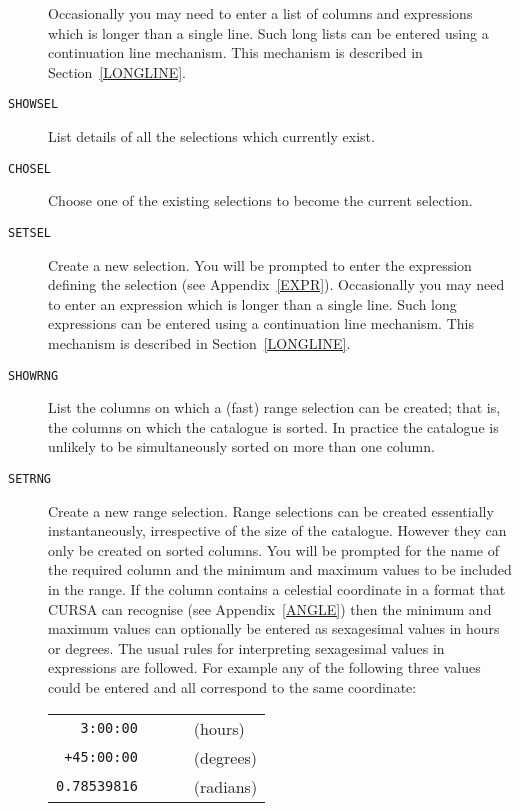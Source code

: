 \documentclass[twoside,11pt]{starlink}
\begin{document}
\begin{description}
   Occasionally you may need to enter a list of columns and expressions
   which is longer than a single line.  Such long lists can be entered
   using a continuation line mechanism.  This mechanism is described in
   Section~\ref{LONGLINE}.

  \item[ \texttt{SHOWSEL} ] List details of all the selections which
   currently exist.

  \item[ \texttt{CHOSEL} ] Choose one of the existing selections to become
   the current selection.

  \item[ \texttt{SETSEL} ] Create a new selection.  You will be prompted to
   enter the expression defining the selection (see Appendix~\ref{EXPR}).
   Occasionally you may need to enter an expression which is longer than a
   single line.  Such long expressions can be entered using a continuation
   line mechanism.  This mechanism is described in Section~\ref{LONGLINE}.

  \item[ \texttt{SHOWRNG} ] List the columns on which a (fast) range
   selection can be created; that is, the columns on which the
   catalogue is sorted. In practice the catalogue is unlikely to be
   simultaneously sorted on more than one column.

  \item[ \texttt{SETRNG} ] Create a new range selection.  Range selections
   can be created essentially instantaneously, irrespective of the
   size of the catalogue.  However they can only be created on sorted
   columns.  You will be prompted for the name of the required column
   and the minimum and maximum values to be included in the range. If
   the column contains a celestial coordinate in a format that CURSA
   can recognise (see Appendix~\ref{ANGLE}) then the minimum and
   maximum values can optionally be entered as sexagesimal values in
   hours or degrees.  The usual rules for interpreting sexagesimal
   values in expressions are followed.  For example any of the following
   three values could be entered and all correspond to the same
   coordinate:

  \begin{center}
  \begin{tabular}{rll}
   \texttt{3:00:00}    & ~~~ & (hours)   \\
   \texttt{+45:00:00}  & ~~~ & (degrees) \\
   \texttt{0.78539816} & ~~~ & (radians) \\
  \end{tabular}
  \end{center}


\end{description}
\end{document}

